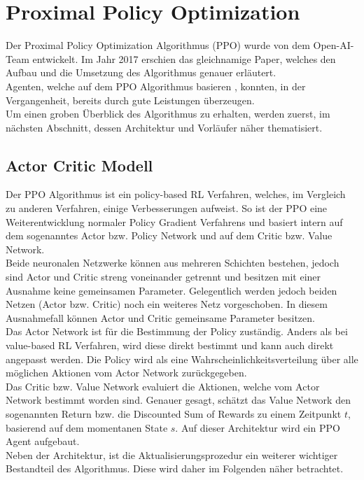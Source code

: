 \section{Proximal Policy Optimization} \label{sec:Grundlagen_PPO}
Der Proximal Policy Optimization Algorithmus (PPO) wurde von dem Open-AI-Team entwickelt. Im Jahr 2017 erschien das gleichnamige Paper, welches den Aufbau und die Umsetzung des Algorithmus genauer erläutert. \citep{PPO} \\
Agenten, welche auf dem PPO Algorithmus basieren , konnten, in der Vergangenheit, bereits durch gute Leistungen überzeugen.\\
Um einen groben Überblick des Algorithmus zu erhalten, werden zuerst, im nächsten Abschnitt, dessen Architektur und Vorläufer näher thematisiert.

\subsection{Actor Critic Modell} \label{subsec:Grundlagen_actor_critic}
Der PPO Algorithmus ist ein policy-based  RL Verfahren, welches, im Vergleich zu anderen Verfahren, einige Verbesserungen aufweist. So ist der PPO eine Weiterentwicklung normaler Policy Gradient Verfahrens und basiert intern auf dem sogenanntes Actor bzw. Policy Network und auf dem Critic bzw. Value Network. \citep[S. 273 f.]{Sutton1998}\\
Beide neuronalen Netzwerke können aus mehreren Schichten bestehen, jedoch sind Actor und Critic streng voneinander getrennt und besitzen mit einer Ausnahme keine gemeinsamen Parameter. Gelegentlich werden jedoch beiden Netzen (Actor bzw. Critic) noch ein weiteres Netz vorgeschoben. In diesem Ausnahmefall können Actor und Critic gemeinsame Parameter besitzen.\\
Das Actor Network ist für die Bestimmung der Policy zuständig. Anders als bei value-based  RL Verfahren, wird diese direkt bestimmt und kann auch direkt angepasst werden. Die Policy wird als eine Wahrscheinlichkeitsverteilung über alle möglichen Aktionen vom Actor Network zurückgegeben. \\
Das Critic bzw. Value Network evaluiert die Aktionen, welche vom Actor Network bestimmt worden sind. Genauer gesagt, schätzt das Value Network den sogenannten Return bzw. die Discounted Sum of Rewards  zu einem Zeitpunkt $t$, basierend auf dem momentanen State $s$. Auf dieser Architektur wird ein PPO Agent aufgebaut.\\
Neben der Architektur, ist die Aktualisierungsprozedur ein weiterer wichtiger Bestandteil des Algorithmus. Diese wird daher im Folgenden näher betrachtet.

